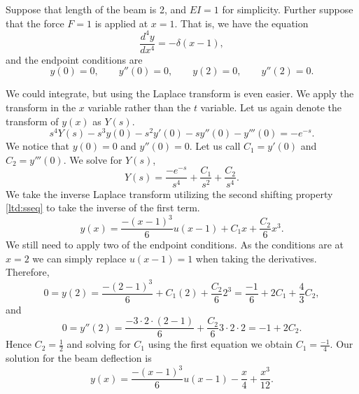 \begin{example} \label{lt:examplebeam}
Suppose that length of the beam is 2, and $EI=1$ for
simplicity.  Further suppose that the force $F=1$ is applied at $x=1$.
That is, we have the equation
\begin{equation*}
\frac{d^4 y}{dx^4} = -\delta(x-1) ,
\end{equation*}
and the endpoint conditions are
\begin{equation*}
y(0) = 0, \qquad y''(0) = 0, \qquad
y(2) = 0, \qquad y''(2) = 0.
\end{equation*}

We could integrate, but using the Laplace transform
is even easier.
We apply the transform
in the $x$ variable rather than the $t$ variable.  Let us again denote the
transform of $y(x)$ as $Y(s)$.
\begin{equation*}
s^4Y(s)-s^3y(0)-s^2y'(0)-sy''(0)-y'''(0)
= -e^{-s}.
\end{equation*}
We notice that $y(0) = 0$ and $y''(0) = 0$.  Let us
call $C_1 = y'(0)$ and $C_2=y'''(0)$.
We solve for $Y(s)$,
\begin{equation*}
Y(s) = \frac{-e^{-s}}{s^4} + \frac{C_1}{s^2}+ \frac{C_2}{s^4} .
\end{equation*}
We take the inverse Laplace transform utilizing the 
second shifting property \eqref{ltd:sseq} to take the inverse of the first
term.
\begin{equation*}
y(x) = \frac{-{(x-1)}^3}{6} u(x-1) + C_1 x + \frac{C_2}{6} x^3 .
\end{equation*}
We still need to apply two of the endpoint conditions.  As the conditions
are at $x=2$ we can simply replace $u(x-1) = 1$ when taking
the derivatives.  Therefore,
\begin{equation*}
0 = y(2) = \frac{-{(2-1)}^3}{6} + C_1 (2) + \frac{C_2}{6} 2^3 =
\frac{-1}{6} + 2 C_1 + \frac{4}{3} C_2 ,
\end{equation*}
and
\begin{equation*}
0 = y''(2) = \frac{-3\cdot 2 \cdot (2-1)}{6} + \frac{C_2}{6} 3\cdot 2 \cdot 2
 = -1 + 2 C_2 .
\end{equation*}
Hence $C_2 = \frac{1}{2}$ and solving for $C_1$ using the first
equation we obtain
$C_1 = \frac{-1}{4}$.  Our solution for the beam deflection is
\begin{equation*}
y(x) = \frac{-{(x-1)}^3}{6} u(x-1) - \frac{x}{4} + \frac{x^3}{12} .
\end{equation*}
\end{example}

